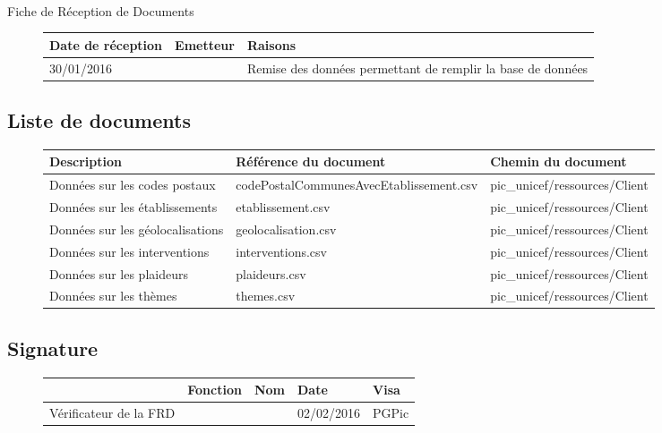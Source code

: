 \documentclass[asi, sansVersion]{picInsa}
\begin{document}
\begin{center}
\huge
\nomEquipe{}\\
Fiche de Réception de Documents\\
\end{center}
\vspace{0.5cm}


\begin{figure}[H]
		\centering
		\begin{tabularx}{17cm}{|X|X|X|}
		\hline
		\rowcolor[gray]{0.85}Date de réception & Emetteur & Raisons \\
		\hline
		30/01/2016 & \nomClient{} & Remise des données permettant de remplir la base de données\\
		\hline
		\end{tabularx}
\end{figure}

\subsection*{Liste de documents}

\begin{figure}[H]
		\centering
		\begin{tabularx}{17cm}{|X|X|X|}
		\hline
		\rowcolor[gray]{0.85} Description & Référence du document & Chemin du document \\
		\hline		
		Données sur les codes postaux & codePostalCommunesAvecEtablissement.csv & pic\_unicef/ressources/Client \\
		\hline
		Données sur les établissements & etablissement.csv & pic\_unicef/ressources/Client\\
		\hline
		Données sur les géolocalisations & geolocalisation.csv & pic\_unicef/ressources/Client\\
		\hline
		Données sur les interventions & interventions.csv & pic\_unicef/ressources/Client\\
		\hline
		Données sur les plaideurs & plaideurs.csv & pic\_unicef/ressources/Client\\
		\hline
		Données sur les thèmes & themes.csv & pic\_unicef/ressources/Client\\
		\hline
		\end{tabularx}
\end{figure}

\subsection*{Signature}

\begin{figure}[H]
		\centering
		\begin{tabularx}{17cm}{|p{4cm}|X|X|X|X|}
		\hline
		\rowcolor[gray]{0.85}& Fonction & Nom & Date & Visa \\
		\hline
		 Vérificateur de la FRD & \RGC & \Mathieu & 02/02/2016 & PGPic \\
		\hline
		\end{tabularx}
\end{figure}
\end{document}
